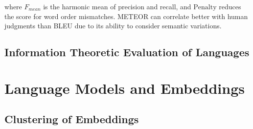 where $ F_{mean} $ is the harmonic mean of precision and recall, and $\text{Penalty}$ reduces the score for word order mismatches. METEOR can correlate better with human judgments than BLEU 
due to its ability to consider semantic variations.


\subsection{Information Theoretic Evaluation of Languages}


\section{Language Models and Embeddings}

\subsection{Clustering of Embeddings}



